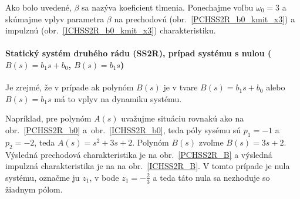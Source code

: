 \documentclass[a4paper, 10pt, ]{article}
\begin{document}
\begin{center}


	\label{ICHSS2R_b0_kmit}

\end{center}

Ako bolo uvedené, $\beta$ sa nazýva koeficient tlmenia. Ponechajme voľbu $\omega_0 = 3$ a skúmajme vplyv parametra $\beta$ na prechodovú (obr.~\ref{PCHSS2R_b0_kmit_x3}) a impulznú (obr.~\ref{ICHSS2R_b0_kmit_x3}) charakteristiku.

\begin{center}


	\label{PCHSS2R_b0_kmit_x3}

\end{center}


\begin{center}


	\label{ICHSS2R_b0_kmit_x3}

\end{center}






\paragraph{Statický systém druhého rádu (SS2R), prípad systému s nulou ($B(s) = b_1 s + b_0$, $B(s) = b_1 s$)}

Je zrejmé, že v prípade ak polynóm $B(s)$ je v tvare $B(s) = b_1 s + b_0$ alebo $B(s) = b_1 s$ má to vplyv na dynamiku systému.

Napríklad, pre polynóm $A(s)$ uvažujme situáciu rovnakú ako na obr.~\ref{PCHSS2R_b0} a~obr.~\ref{ICHSS2R_b0}, teda póly sysému sú $p_1 = -1$ a $p_2 = -2$, teda $A(s) = s^2 + 3s + 2$. Polynóm $B(s)$ zvoľme $B(s) = 3 s + 2$. Výsledná prechodová charakteristika je na obr.~\ref{PCHSS2R_B} a výsledná impulzná charakteristika je na na obr.~\ref{ICHSS2R_B}. V tomto prípade je nula systému, označme ju $z_1$, v bode $z_1 = -\frac{2}{3}$ a teda táto nula sa nezhoduje so žiadnym pólom.
\end{document}
